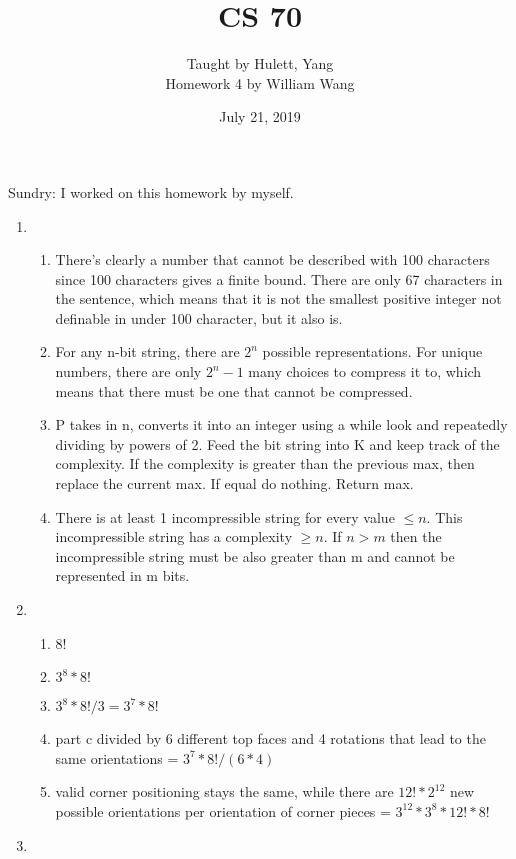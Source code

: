 \documentclass[a4paper]{article}
\title{\textbf{CS 70}}
\author{\large Taught by Hulett, Yang\\
Homework 4 by William Wang}
\date{July 21, 2019}
\newcommand{\<}{\langle}
\renewcommand{\>}{\rangle}
\renewcommand{\^}{\wedge}
\begin{document}
\maketitle
\newpage
Sundry: I worked on this homework by myself.\\
\begin{enumerate}
    \item
        \begin{enumerate}
            \item There's clearly a number that cannot be described with 100 characters since 100 characters gives a finite bound. There are only 67 characters in the sentence, which means that it is not the smallest positive integer not definable in under 100 character, but it also is.
            \item For any n-bit string, there are $2^n$ possible representations. For unique numbers, there are only $2^n - 1$ many choices to compress it to, which means that there must be one that cannot be compressed.
            \item P takes in n, converts it into an integer using a while look and repeatedly dividing by powers of 2. Feed the bit string into K and keep track of the complexity. If the complexity is greater than the previous max, then replace the current max. If equal do nothing. Return max.
            \item There is at least 1 incompressible string for every value $\leq n$. This incompressible string has a complexity $\geq n$. If $n > m$ then the incompressible string must be also greater than m and cannot be represented in m bits.
        \end{enumerate}
    \item 
        \begin{enumerate}
            \item 8!
            \item $3^8 * 8!$
            \item $3^8 * 8! / 3 = 3^7 * 8!$
            \item part c divided by 6 different top faces and 4 rotations that lead to the same orientations = $3^7 * 8!/(6*4)$
            \item valid corner positioning stays the same, while there are $12! * 2^12$ new possible orientations per orientation of corner pieces = $3^12 * 3^8 * 12! * 8!$
        \end{enumerate}
    \item  
        \begin{enumerate}

\end{enumerate}
\end{enumerate}
\end{document}
